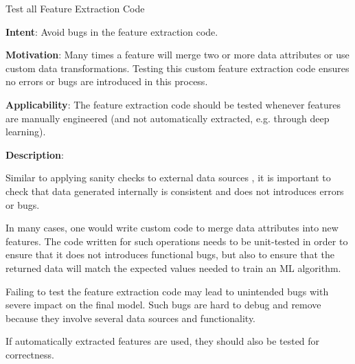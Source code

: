 
  \begin{frame}[plain]{ Test all Feature Extraction Code
 }

  \textbf{Intent}: Avoid bugs in the feature extraction code. 
 

  \textbf{Motivation}: Many times a feature will merge two or more data attributes or use custom data transformations. Testing this custom feature extraction code ensures no errors or bugs are introduced in this process. 
 

  \textbf{Applicability}: The feature extraction code should be tested whenever features are manually  engineered (and not automatically extracted, e.g. through deep learning).
 

  \textbf{Description}: 

Similar to  applying sanity checks to external data sources , it is important to check that data generated internally is consistent and does not introduces errors or bugs.


In many cases, one would write custom code to merge data attributes into new features.
The code written for such operations needs to be unit-tested in order to ensure that it does not introduces functional bugs, but also to ensure that the returned data will match the expected values needed to train an ML algorithm.


Failing to test the feature extraction code may lead to unintended bugs with severe impact on the final model.
Such bugs are hard to debug and remove because they involve several data sources and functionality.


If automatically extracted features are used, they should also be tested for correctness.


 


  \end{frame}

